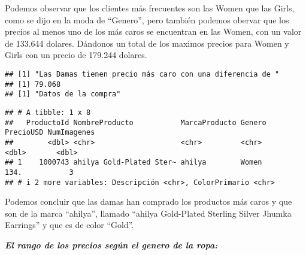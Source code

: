 \documentclass[
]{article}
\newenvironment{Shaded}{\begin{snugshade}}{\end{snugshade}}
\newcommand{\ControlFlowTok}[1]{\textcolor[rgb]{0.13,0.29,0.53}{\textbf{#1}}}
\newcommand{\FunctionTok}[1]{\textcolor[rgb]{0.00,0.00,0.00}{#1}}
\newcommand{\NormalTok}[1]{#1}
\newcommand{\OtherTok}[1]{\textcolor[rgb]{0.56,0.35,0.01}{#1}}
\newcommand{\SpecialCharTok}[1]{\textcolor[rgb]{0.00,0.00,0.00}{#1}}
\newcommand{\StringTok}[1]{\textcolor[rgb]{0.31,0.60,0.02}{#1}}
\begin{document}
Podemos observar que los clientes más frecuentes son las Women que las
Girls, como se dijo en la moda de ``Genero'', pero también podemos
obervar que los precios al menos uno de los más caros se encuentran en
las Women, con un valor de 133.644 dolares. Dándonos un total de los
maximos precios para Women y Girls con un precio de 179.244 dolares.

\begin{Shaded}
\end{Shaded}

\begin{verbatim}
## [1] "Las Damas tienen precio más caro con una diferencia de "
## [1] 79.068
## [1] "Datos de la compra"
\end{verbatim}

\begin{verbatim}
## # A tibble: 1 x 8
##   ProductoId NombreProducto           MarcaProducto Genero PrecioUSD NumImagenes
##        <dbl> <chr>                    <chr>         <chr>      <dbl>       <dbl>
## 1    1000743 ahilya Gold-Plated Ster~ ahilya        Women       134.           3
## # i 2 more variables: Descripción <chr>, ColorPrimario <chr>
\end{verbatim}

Podemos concluir que las damas han comprado los productos más caros y
que son de la marca ``ahilya'', llamado ``ahilya Gold-Plated Sterling
Silver Jhumka Earrings'' y que es de color ``Gold''.

\textbf{\emph{El rango de los precios según el genero de la ropa:}}
\end{document}
